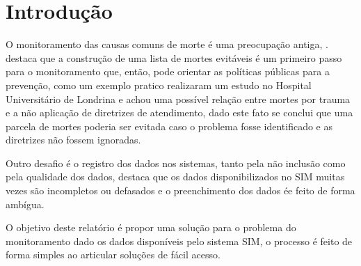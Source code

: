 
\chapter[Introdução]{Introdução}
\label{Introdução}


O monitoramento das causas comuns de morte é uma preocupação antiga, . destaca que a construção de uma lista de mortes evitáveis é um primeiro passo para o monitoramento que, então, pode orientar as políticas públicas para a prevenção, como um exemplo pratico \cite{marson2010mortes} realizaram um estudo no Hospital Universitário de Londrina e achou uma possível relação entre mortes por trauma e a não aplicação de diretrizes de atendimento, dado este fato se conclui que uma parcela de mortes poderia ser evitada caso o problema fosse identificado e as diretrizes não fossem ignoradas.

Outro desafio é o registro dos dados nos sistemas, tanto pela não inclusão como pela qualidade dos dados,  destaca que os dados disponibilizados no SIM muitas vezes são incompletos ou defasados e o preenchimento dos dados ée feito de forma ambígua.

O objetivo deste relatório é propor uma solução para o problema do monitoramento dado os dados disponíveis pelo sistema SIM, o processo é feito de forma simples ao articular soluções de fácil acesso. 
